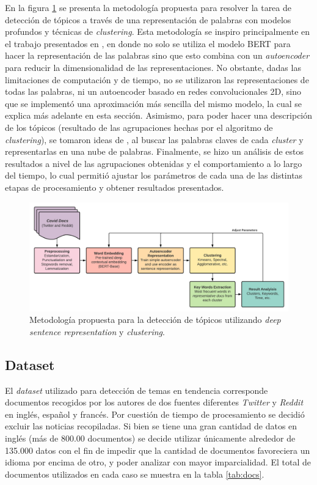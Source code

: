 
En la figura \ref{fig:TopicDetectionDiag} se presenta la metodología propuesta para resolver la tarea de detección de tópicos a través de una representación de palabras con modelos profundos y técnicas de \textit{clustering}. Esta metodología se inspiro principalmente en el trabajo presentados en \cite{DeepRepresentationClusteringTweets}, en donde no solo se utiliza el modelo BERT para hacer la representación de las palabras sino que esto combina con un \textit{autoencoder} para reducir la dimensionalidad de las representaciones. No obstante, dadas las limitaciones de computación y de tiempo, no se utilizaron las representaciones de todas las palabras, ni un autoencoder basado en redes convolucionales 2D, sino que se implementó una aproximación más sencilla del mismo modelo, la cual se explica más adelante en esta sección. Asimismo, para poder hacer una descripción de los tópicos (resultado de las agrupaciones hechas por el algoritmo de \textit{clustering}), se tomaron ideas de \cite{TrendTopicsDetectionFromTwitter}, al buscar las palabras claves de cada \textit{cluster} y representarlas en una nube de palabras. Finalmente, se hizo un análisis de estos resultados a nivel de las agrupaciones obtenidas y el comportamiento a lo largo del tiempo, lo cual permitió ajustar los parámetros de cada una de las distintas etapas de procesamiento y obtener resultados presentados.

\begin{figure}[H]
    \centering
    \includegraphics[width=\textwidth]{doc_hw04/images/TopicDetectionDiag.png}
    \caption{Metodología propuesta para la detección de tópicos utilizando \textit{deep sentence representation} y \textit{clustering}.}
    \label{fig:TopicDetectionDiag}
\end{figure}

\subsection{Dataset}
El \textit{dataset} utilizado para detección de temas en tendencia corresponde documentos recogidos por los autores de dos fuentes diferentes \textit{Twitter} y \textit{Reddit} en inglés, español y francés. Por cuestión de tiempo de procesamiento se decidió excluir las noticias recopiladas. Si bien se tiene una gran cantidad de datos en inglés (más de 800.00 documentos) se decide utilizar únicamente alrededor de 135.000 datos con el fin de impedir que la cantidad de documentos favoreciera un idioma por encima de otro, y poder analizar con mayor imparcialidad. El total de documentos utilizados en cada caso se muestra en la tabla \ref{tab:docs}.

